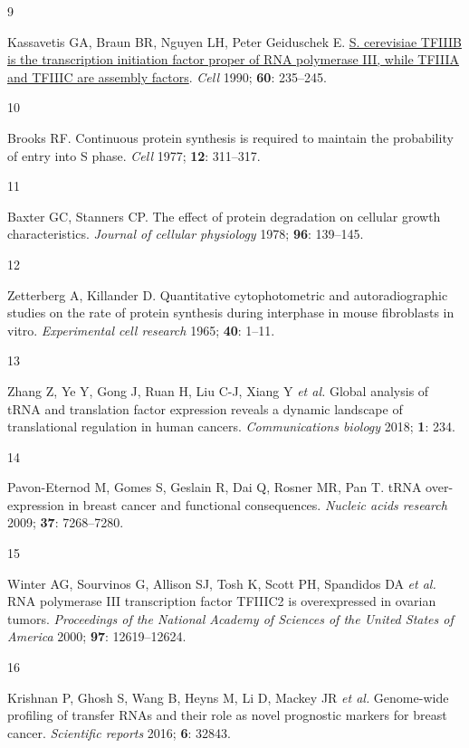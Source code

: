 \documentclass[
  12pt,
]{article}
\newlength{\cslhangindent}
\newlength{\csllabelwidth}
\newlength{\cslentryspacingunit} %
\newenvironment{CSLReferences}[2] %
 {%
  \setlength{\parindent}{0pt}
  \ifodd #1
  \let\oldpar\par
  \def\par{\hangindent=\cslhangindent\oldpar}
  \fi
  \setlength{\parskip}{#2\cslentryspacingunit}
 }%
 {}
\newcommand{\CSLLeftMargin}[1]{\parbox[t]{\csllabelwidth}{#1}}
\newcommand{\CSLRightInline}[1]{\parbox[t]{\linewidth - \csllabelwidth}{#1}\break}
\begin{document}
\begin{CSLReferences}{0}{0}
\leavevmode{}%
\CSLLeftMargin{9 }%
\CSLRightInline{Kassavetis GA, Braun BR, Nguyen LH, Peter Geiduschek E. \href{https://doi.org/10.1016/0092-8674(90)90739-2}{S. cerevisiae TFIIIB is the transcription initiation factor proper of RNA polymerase III, while TFIIIA and TFIIIC are assembly factors}. \emph{Cell} 1990; \textbf{60}: 235--245.}

\leavevmode{}%
\CSLLeftMargin{10 }%
\CSLRightInline{Brooks RF. Continuous protein synthesis is required to maintain the probability of entry into {S} phase. \emph{Cell} 1977; \textbf{12}: 311--317.}

\leavevmode{}%
\CSLLeftMargin{11 }%
\CSLRightInline{Baxter GC, Stanners CP. The effect of protein degradation on cellular growth characteristics. \emph{Journal of cellular physiology} 1978; \textbf{96}: 139--145.}

\leavevmode{}%
\CSLLeftMargin{12 }%
\CSLRightInline{Zetterberg A, Killander D. Quantitative cytophotometric and autoradiographic studies on the rate of protein synthesis during interphase in mouse fibroblasts in vitro. \emph{Experimental cell research} 1965; \textbf{40}: 1--11.}

\leavevmode{}%
\CSLLeftMargin{13 }%
\CSLRightInline{Zhang Z, Ye Y, Gong J, Ruan H, Liu C-J, Xiang Y \emph{et al.} Global analysis of {tRNA} and translation factor expression reveals a dynamic landscape of translational regulation in human cancers. \emph{Communications biology} 2018; \textbf{1}: 234.}

\leavevmode{}%
\CSLLeftMargin{14 }%
\CSLRightInline{Pavon-Eternod M, Gomes S, Geslain R, Dai Q, Rosner MR, Pan T. {tRNA} over-expression in breast cancer and functional consequences. \emph{Nucleic acids research} 2009; \textbf{37}: 7268--7280.}

\leavevmode{}%
\CSLLeftMargin{15 }%
\CSLRightInline{Winter AG, Sourvinos G, Allison SJ, Tosh K, Scott PH, Spandidos DA \emph{et al.} {RNA} polymerase {III} transcription factor {TFIIIC2} is overexpressed in ovarian tumors. \emph{Proceedings of the National Academy of Sciences of the United States of America} 2000; \textbf{97}: 12619--12624.}

\leavevmode{}%
\CSLLeftMargin{16 }%
\CSLRightInline{Krishnan P, Ghosh S, Wang B, Heyns M, Li D, Mackey JR \emph{et al.} Genome-wide profiling of transfer {RNAs} and their role as novel prognostic markers for breast cancer. \emph{Scientific reports} 2016; \textbf{6}: 32843.}


\end{CSLReferences}
\end{document}
